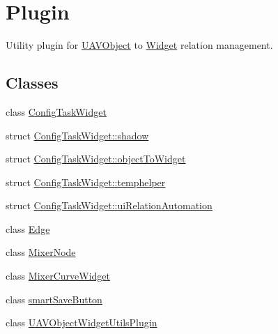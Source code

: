 \hypertarget{group___u_a_v_object_widget_utils}{\section{\-Plugin}
\label{group___u_a_v_object_widget_utils}
}


\-Utility plugin for \hyperlink{class_u_a_v_object}{\-U\-A\-V\-Object} to \hyperlink{class_widget}{\-Widget} relation management.  


\subsection*{\-Classes}
\begin{DoxyCompactItemize}
\item 
class \hyperlink{class_config_task_widget}{\-Config\-Task\-Widget}
\item 
struct \hyperlink{struct_config_task_widget_1_1shadow}{\-Config\-Task\-Widget\-::shadow}
\item 
struct \hyperlink{struct_config_task_widget_1_1object_to_widget}{\-Config\-Task\-Widget\-::object\-To\-Widget}
\item 
struct \hyperlink{struct_config_task_widget_1_1temphelper}{\-Config\-Task\-Widget\-::temphelper}
\item 
struct \hyperlink{struct_config_task_widget_1_1ui_relation_automation}{\-Config\-Task\-Widget\-::ui\-Relation\-Automation}
\item 
class \hyperlink{class_edge}{\-Edge}
\item 
class \hyperlink{class_mixer_node}{\-Mixer\-Node}
\item 
class \hyperlink{class_mixer_curve_widget}{\-Mixer\-Curve\-Widget}
\item 
class \hyperlink{classsmart_save_button}{smart\-Save\-Button}
\item 
class \hyperlink{class_u_a_v_object_widget_utils_plugin}{\-U\-A\-V\-Object\-Widget\-Utils\-Plugin}
\end{DoxyCompactItemize}

